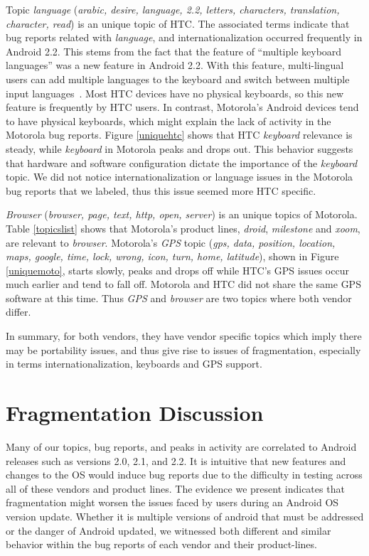 \documentclass[10pt, conference, compsocconf]{IEEEtran}
\begin{document}
Topic \textit{language} (\textit{arabic, desire, language, 2.2, letters,
  characters, translation, character, read}) is an unique topic of
HTC. The associated terms indicate that bug reports related with
\textit{language}, and internationalization occurred frequently in
Android 2.2. 
This stems from
the fact that the feature of ``multiple keyboard languages'' was a new
feature in Android 2.2. With this feature, multi-lingual users can add
multiple languages to the keyboard and switch between multiple
input languages~\cite{androidwebsite}. Most
HTC devices have no physical keyboards, so this new feature is 
frequently by HTC users. In contrast, Motorola's Android devices tend
to  have physical keyboards, which might explain the lack of activity
in the  Motorola bug reports.
Figure \ref{uniquehtc} shows that
HTC \textit{keyboard} relevance is steady, while \textit{keyboard} in
Motorola peaks and drops out. This behavior suggests that hardware
and software configuration dictate the importance of the \emph{keyboard}
topic.
We did not notice internationalization or language issues in the
Motorola bug reports that we labeled, thus this issue seemed more HTC
specific.


\textit{Browser} (\textit{browser, page, text, http, open, server}) is
an unique topics of Motorola. Table \ref{topicslist} shows that
Motorola's product lines,
\textit{droid}, \textit{milestone} and \textit{xoom}, are relevant
to \textit{browser}.
Motorola's \textit{GPS} topic
(\textit{gps, data, position, location, maps, google, time, lock,
  wrong, icon, turn, home, latitude}), shown in Figure
\ref{uniquemoto},
starts slowly, peaks and drops off while HTC's GPS issues occur much
earlier and tend to fall off.
Motorola and HTC did not share the same GPS software at this
time. Thus \emph{GPS} and \emph{browser} are two topics where both vendor differ.

In summary, for both vendors, they have vendor specific topics which imply
there may be portability issues, and thus give rise to issues of
fragmentation, especially in terms internationalization, keyboards and
GPS support.

\section{Fragmentation Discussion}
\label{sec:fragmentation}


Many of our topics, bug reports, and peaks in activity are correlated
to Android releases such as versions 2.0, 2.1, and 2.2. It is
intuitive that new features and changes to the OS would induce bug
reports due to the difficulty in testing across all of these vendors
and product lines. The evidence we present indicates that
fragmentation might worsen the issues faced by users during an Android
OS version update.
Whether it is multiple versions of android that must be addressed or
the danger of Android updated, we witnessed both different and similar
behavior within the bug reports of each vendor and their product-lines.
\end{document}

